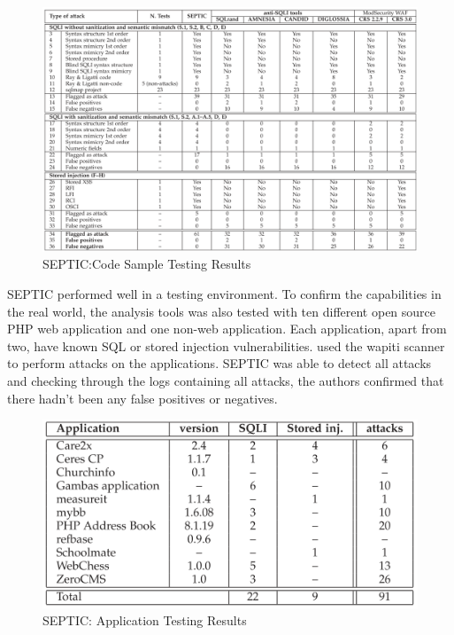 \begin{figure}
\centering
\includegraphics[scale=0.65]{septic_results.PNG}
\caption{SEPTIC:Code Sample Testing Results \autocite[1182]{Medeiros2019}}
\label{septic1}
\end{figure}

SEPTIC performed well in a testing environment. To confirm the capabilities in the real world, the analysis tools was also tested with ten different open source PHP web application and one non-web application. Each application, apart from two, have known SQL or stored injection vulnerabilities. \textcite[]{Medeiros2019} used the wapiti scanner \autocite[]{Surribas2016} to perform attacks on the applications. SEPTIC was able to detect all attacks and checking through the logs containing all attacks, the authors confirmed that there hadn't been any false positives or negatives. 

\begin{figure}[H]
\centering
\includegraphics[scale=0.75]{septic_application_test.PNG}
\caption{SEPTIC: Application Testing Results \autocite[1183]{Medeiros2019}}
\end{figure}

